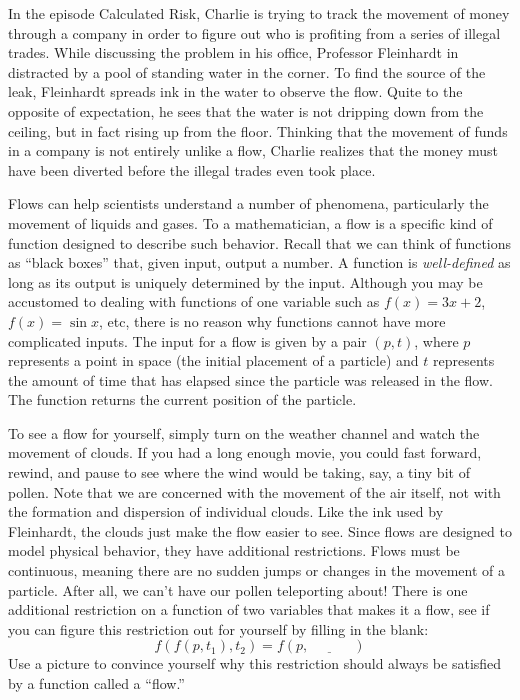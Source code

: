 \newpage
{}
{}
\setcounter{activity}{0}

In the episode Calculated Risk, Charlie is trying to track the movement of money through a company in order to figure out who is profiting from a series of illegal trades. While discussing the problem in his office, Professor Fleinhardt in distracted by a pool of standing water in the corner. To find the source of the leak, Fleinhardt spreads ink in the water to observe the flow. Quite to the opposite of expectation, he sees that the water is not dripping down from the ceiling, but in fact rising up from the floor. Thinking that the movement of funds in a company is not entirely unlike a flow, Charlie realizes that the money must have been diverted before the illegal trades even took place. \\




Flows can help scientists understand a number of phenomena, particularly the movement of liquids and gases. To a mathematician, a flow is a specific kind of function designed to describe such behavior. Recall that we can think of functions as ``black boxes'' that, given input, output a number. A function is \emph{well-defined} as long as its output is uniquely determined by the input. Although you may be accustomed to dealing with functions of one variable such as $f(x) = 3x + 2$, $f(x)= \sin x$, etc, there is no reason why functions cannot have more complicated inputs. The input for a flow is given by a pair $(p,t)$, where $p$ represents a point in space (the initial placement of a particle) and $t$ represents the amount of time that has elapsed since the particle was released in the flow. The function returns the current position of the particle.


To see a flow for yourself, simply turn on the weather channel and watch the movement of clouds. If you had a long enough movie, you could fast forward, rewind, and pause to see where the wind would be taking, say, a tiny bit of pollen. Note that we are concerned with the movement of the air itself, not with the formation and dispersion of individual clouds. Like the ink used by Fleinhardt, the clouds just make the flow easier to see. Since flows are designed to model physical behavior, they have additional restrictions. Flows must be continuous, meaning there are no sudden jumps or changes in the movement of a particle. After all, we can't have our pollen teleporting about! There is one additional restriction on a function of two variables that makes it a flow, see if you can figure this restriction out for yourself by filling in the blank:
	\[
	f(f(p,t_1),t_2)= f(p,\underline{\phantom{xxxxx}}\;)
	\]
Use a picture to convince yourself why this restriction should always be satisfied by a function called a ``flow.''


